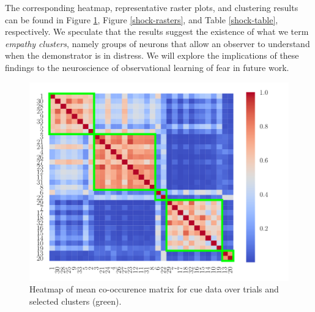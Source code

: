 \documentclass[twoside]{article}
\begin{document}
The corresponding heatmap, representative raster plots, and clustering results can be found in Figure \ref{shock-hm}, Figure \ref{shock-rasters}, and Table \ref{shock-table}, respectively. We speculate that the results suggest the existence of what we term \emph{empathy clusters}, namely groups of neurons that allow an observer to understand when the demonstrator is in distress. We will explore the implications of these findings to the neuroscience of observational learning of fear in future work.
\begin{figure}[h]
\begin{center}
\includegraphics[scale=0.3]{../img/shock_mod_cue.pdf}
\end{center}
\caption{Heatmap of mean co-occurence matrix for cue data over trials and selected clusters (green).} 
\label{shock-hm}
\end{figure} 

\end{document}
